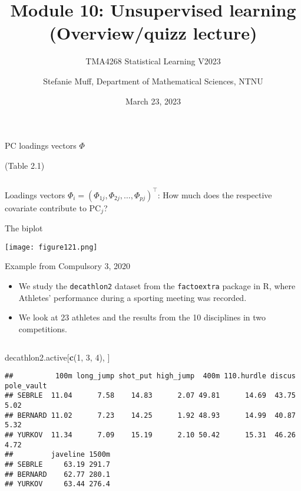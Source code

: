 \documentclass[
  10pt,
  ignorenonframetext,
]{beamer}
\title{Module 10: Unsupervised learning (Overview/quizz lecture)}
\subtitle{TMA4268 Statistical Learning V2023}
\author{Stefanie Muff, Department of Mathematical Sciences, NTNU}
\date{March 23, 2023}
\newenvironment{Shaded}{\begin{snugshade}}{\end{snugshade}}
\newcommand{\DecValTok}[1]{\textcolor[rgb]{0.00,0.00,0.81}{#1}}
\newcommand{\FunctionTok}[1]{\textcolor[rgb]{0.13,0.29,0.53}{\textbf{#1}}}
\newcommand{\NormalTok}[1]{#1}
\begin{document}
\frame{\titlepage}

\begin{frame}
\begin{block}{PC loadings vectors \(\Phi\)}
\protect\hypertarget{pc-loadings-vectors-phi}{}
\(~\)

\centering

\flushleft

(Table 2.1)

\(~\)

Loadings vectors
\(\Phi_i=(\Phi_{1j} , \Phi_{2j},\ldots, \Phi_{pj})^\top\): How much does
the respective covariate contribute to PC\(_j\)?
\end{block}
\end{frame}

\begin{frame}
\begin{block}{The biplot}
\protect\hypertarget{the-biplot}{}
\(~\)

\centering

\texttt{[image: figure121.png]}
\end{block}
\end{frame}

\begin{frame}[fragile]
\begin{block}{Example from Compulsory 3, 2020}
\protect\hypertarget{example-from-compulsory-3-2020}{}
\(~\)

\begin{itemize}
\item
  We study the \texttt{decathlon2} dataset from the \texttt{factoextra}
  package in R, where Athletes' performance during a sporting meeting
  was recorded.
\item
  We look at 23 athletes and the results from the 10 disciplines in two
  competitions.
\end{itemize}

\(~\)

\scriptsize

\begin{Shaded}
\begin{Highlighting}[]
\NormalTok{decathlon2.active[}\FunctionTok{c}\NormalTok{(}\DecValTok{1}\NormalTok{, }\DecValTok{3}\NormalTok{, }\DecValTok{4}\NormalTok{), ]}
\end{Highlighting}
\end{Shaded}

\begin{verbatim}
##          100m long_jump shot_put high_jump  400m 110.hurdle discus pole_vault
## SEBRLE  11.04      7.58    14.83      2.07 49.81      14.69  43.75       5.02
## BERNARD 11.02      7.23    14.25      1.92 48.93      14.99  40.87       5.32
## YURKOV  11.34      7.09    15.19      2.10 50.42      15.31  46.26       4.72
##         javeline 1500m
## SEBRLE     63.19 291.7
## BERNARD    62.77 280.1
## YURKOV     63.44 276.4
\end{verbatim}
\end{block}
\end{frame}
\end{document}
